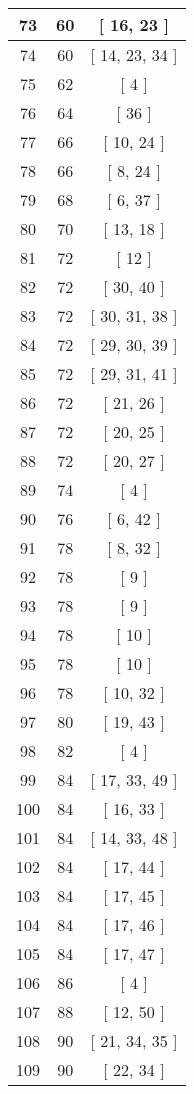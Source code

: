 \begin{center}
\begin{longtable}[H]{|| c c c ||}
73 & 60 & [ 16, 23 ] \\ 
\hline
74 & 60 & [ 14, 23, 34 ] \\ 
\hline
75 & 62 & [ 4 ] \\ 
\hline
76 & 64 & [ 36 ] \\ 
\hline
77 & 66 & [ 10, 24 ] \\ 
\hline
78 & 66 & [ 8, 24 ] \\ 
\hline
79 & 68 & [ 6, 37 ] \\ 
\hline
80 & 70 & [ 13, 18 ] \\ 
\hline
81 & 72 & [ 12 ] \\ 
\hline
82 & 72 & [ 30, 40 ] \\ 
\hline
83 & 72 & [ 30, 31, 38 ] \\ 
\hline
84 & 72 & [ 29, 30, 39 ] \\ 
\hline
85 & 72 & [ 29, 31, 41 ] \\ 
\hline
86 & 72 & [ 21, 26 ] \\ 
\hline
87 & 72 & [ 20, 25 ] \\ 
\hline
88 & 72 & [ 20, 27 ] \\ 
\hline
89 & 74 & [ 4 ] \\ 
\hline
90 & 76 & [ 6, 42 ] \\ 
\hline
91 & 78 & [ 8, 32 ] \\ 
\hline
92 & 78 & [ 9 ] \\ 
\hline
93 & 78 & [ 9 ] \\ 
\hline
94 & 78 & [ 10 ] \\ 
\hline
95 & 78 & [ 10 ] \\ 
\hline
96 & 78 & [ 10, 32 ] \\ 
\hline
97 & 80 & [ 19, 43 ] \\ 
\hline
98 & 82 & [ 4 ] \\ 
\hline
99 & 84 & [ 17, 33, 49 ] \\ 
\hline
100 & 84 & [ 16, 33 ] \\ 
\hline
101 & 84 & [ 14, 33, 48 ] \\ 
\hline
102 & 84 & [ 17, 44 ] \\ 
\hline
103 & 84 & [ 17, 45 ] \\ 
\hline
104 & 84 & [ 17, 46 ] \\ 
\hline
105 & 84 & [ 17, 47 ] \\ 
\hline
106 & 86 & [ 4 ] \\ 
\hline
107 & 88 & [ 12, 50 ] \\ 
\hline
108 & 90 & [ 21, 34, 35 ] \\ 
\hline
109 & 90 & [ 22, 34 ] \\ 

\end{longtable}
\end{center}
